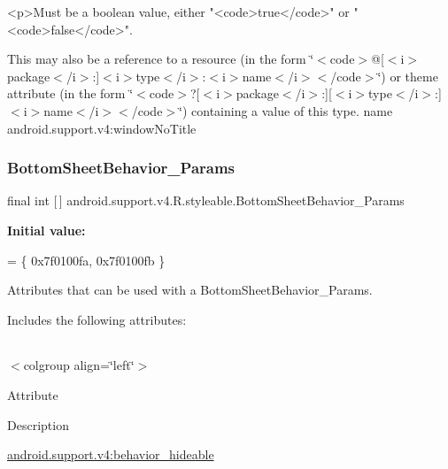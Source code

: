 \begin{DoxyVerb}      <p>Must be a boolean value, either "<code>true</code>" or "<code>false</code>".
\end{DoxyVerb}
 

This may also be a reference to a resource (in the form \char`\"{}$<$code$>$@\mbox{[}$<$i$>$package$<$/i$>$\+:\mbox{]}$<$i$>$type$<$/i$>$\+:$<$i$>$name$<$/i$>$$<$/code$>$\char`\"{}) or theme attribute (in the form \char`\"{}$<$code$>$?\mbox{[}$<$i$>$package$<$/i$>$\+:\mbox{]}\mbox{[}$<$i$>$type$<$/i$>$\+:\mbox{]}$<$i$>$name$<$/i$>$$<$/code$>$\char`\"{}) containing a value of this type.  name android.\+support.\+v4\+:window\+No\+Title \mbox{\label{classandroid_1_1support_1_1v4_1_1R_1_1styleable_aeef0bb6121e7d6065d53100656871173}} 
\subsubsection{\texorpdfstring{Bottom\+Sheet\+Behavior\+\_\+\+Params}{BottomSheetBehavior\_Params}}
{\footnotesize\ttfamily final int \mbox{[}$\,$\mbox{]} android.\+support.\+v4.\+R.\+styleable.\+Bottom\+Sheet\+Behavior\+\_\+\+Params\hspace{0.3cm}{\ttfamily [static]}}

{\bfseries Initial value\+:}
\begin{DoxyCode}
= \{
            0x7f0100fa, 0x7f0100fb
        \}
\end{DoxyCode}
Attributes that can be used with a Bottom\+Sheet\+Behavior\+\_\+\+Params. 

Includes the following attributes\+:

\tabulinesep=1mm
\begin{longtabu} spread 0pt [c]{*{0}{|X[-1]}|}
\hline
\end{longtabu}
$<$colgroup align=\char`\"{}left\char`\"{}$>$ 

Attribute

Description 

{\ttfamily \hyperlink{classandroid_1_1support_1_1v4_1_1R_1_1styleable_aa0e0b1fe9eb8320ac0c20a9fdd74f3f9}{android.\+support.\+v4\+:behavior\+\_\+hideable}}

